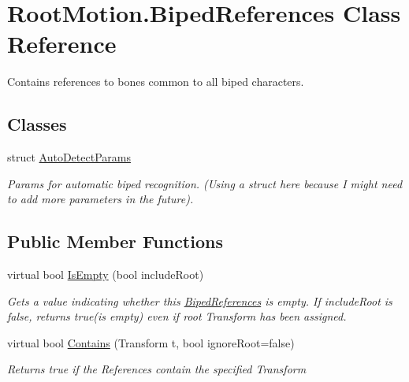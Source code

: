 \hypertarget{class_root_motion_1_1_biped_references}{}\section{Root\+Motion.\+Biped\+References Class Reference}
\label{class_root_motion_1_1_biped_references}


Contains references to bones common to all biped characters.  


\subsection*{Classes}
\begin{DoxyCompactItemize}
\item 
struct \mbox{\hyperlink{struct_root_motion_1_1_biped_references_1_1_auto_detect_params}{Auto\+Detect\+Params}}
\begin{DoxyCompactList}\small\item\em Params for automatic biped recognition. (Using a struct here because I might need to add more parameters in the future). \end{DoxyCompactList}\end{DoxyCompactItemize}
\subsection*{Public Member Functions}
\begin{DoxyCompactItemize}
\item 
virtual bool \mbox{\hyperlink{class_root_motion_1_1_biped_references_a9b09e3a8851e9b5709571de3895fc24c}{Is\+Empty}} (bool include\+Root)
\begin{DoxyCompactList}\small\item\em Gets a value indicating whether this \mbox{\hyperlink{class_root_motion_1_1_biped_references}{Biped\+References}} is empty. If include\+Root is false, returns true(is empty) even if root Transform has been assigned. \end{DoxyCompactList}\item 
virtual bool \mbox{\hyperlink{class_root_motion_1_1_biped_references_ab0b1faadbb6500da51504049e8302409}{Contains}} (Transform t, bool ignore\+Root=false)
\begin{DoxyCompactList}\small\item\em Returns true if the References contain the specified Transform \end{DoxyCompactList}\end{DoxyCompactItemize}
